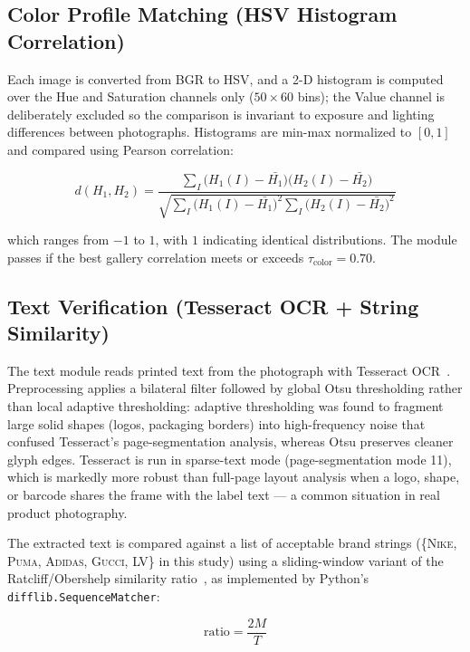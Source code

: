 \documentclass[conference]{IEEEtran}
\begin{document}
\subsection{Color Profile Matching (HSV Histogram Correlation)}

Each image is converted from BGR to HSV, and a 2-D histogram is computed
over the Hue and Saturation channels only ($50 \times 60$ bins); the Value
channel is deliberately excluded so the comparison is invariant to
exposure and lighting differences between photographs. Histograms are
min-max normalized to $[0,1]$ and compared using Pearson correlation:

\begin{equation}
d(H_1, H_2) = \frac{\sum_{I} \big(H_1(I) - \bar{H_1}\big)\big(H_2(I) - \bar{H_2}\big)}
{\sqrt{\sum_{I} \big(H_1(I) - \bar{H_1}\big)^2 \sum_{I} \big(H_2(I) - \bar{H_2}\big)^2}}
\end{equation}

which ranges from $-1$ to $1$, with $1$ indicating identical
distributions. The module passes if the best gallery correlation meets or
exceeds $\tau_{\text{color}} = 0.70$.

\subsection{Text Verification (Tesseract OCR + String Similarity)}

The text module reads printed text from the photograph with Tesseract
OCR~\cite{tesseract2007}. Preprocessing applies a bilateral filter
followed by global Otsu thresholding rather than local adaptive
thresholding: adaptive thresholding was found to fragment large solid
shapes (logos, packaging borders) into high-frequency noise that confused
Tesseract's page-segmentation analysis, whereas Otsu preserves cleaner
glyph edges. Tesseract is run in sparse-text mode (page-segmentation mode
11), which is markedly more robust than full-page layout analysis when a
logo, shape, or barcode shares the frame with the label text --- a common
situation in real product photography.

The extracted text is compared against a list of acceptable brand strings
(\{\textsc{Nike}, \textsc{Puma}, \textsc{Adidas}, \textsc{Gucci},
\textsc{LV}\} in this study) using a sliding-window variant of
the Ratcliff/Obershelp similarity ratio~\cite{ratcliff1988}, as
implemented by Python's \texttt{difflib.SequenceMatcher}:

\begin{equation}
\text{ratio} = \frac{2M}{T}
\end{equation}
\end{document}
